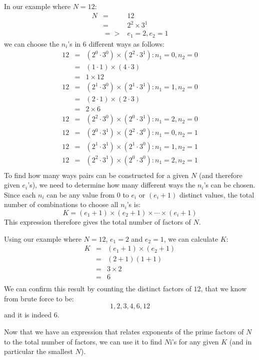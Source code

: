 \documentclass{article}
\begin{document}
In our example where $N =12$:
\begin{eqnarray*}
N & = & 12\\
& = & 2 ^ 2 \times 3 ^ 1 \\
& => & e_1 = 2, e_2 = 1
\end{eqnarray*}
we can choose the $n_i$'s in 6 different ways as follows:
\begin{eqnarray*}
12 &=& (2^0 \cdot 3^0) \times (2^2 \cdot 3^1) : n_1 = 0, n_2 = 0 \\
   &=& (1 \cdot 1) \times (4 \cdot 3) \\
   &=& 1 \times 12 \\
12 &=& (2^1 \cdot 3^0) \times (2^1 \cdot 3^1) : n_1 = 1, n_2 = 0\\
   &=& (2 \cdot 1) \times (2 \cdot 3) \\
   &=& 2 \times 6 \\
12 &=& (2^2 \cdot 3^0) \times (2^0 \cdot 3^1) : n_1 = 2, n_2 = 0\\
12 &=& (2^0 \cdot 3^1) \times (2^2 \cdot 3^0) : n_1 = 0, n_2 = 1\\
12 &=& (2^1 \cdot 3^1) \times (2^1 \cdot 3^0) : n_1 = 1, n_2 = 1\\
12 &=& (2^2 \cdot 3^1) \times (2^0 \cdot 3^0) : n_1 = 2, n_2 = 1\\
\end{eqnarray*}
To find how many ways pairs can be constructed for a given $N$ (and therefore given $e_i$'s), we need to determine how many different ways the $n_i$'s can be chosen. 
Since each $n_i$ can be any value from $0$ to $e_i$ or $(e_i + 1)$ distinct values, the total number of combinations to choose all $n_i$'s is:
$$
K = (e_1 +1) \times (e_2 + 1) \times \cdots \times (e_i + 1)
$$
This expression therefore gives the total number of factors of $N$.

Using our example where $N = 12$, $e_1 = 2$ and $e_2 = 1$, we can calculate $K$:
\begin{eqnarray*}
K & = & (e_1 +1) \times (e_2 + 1) \\
  & = & (2 + 1) ( 1 + 1) \\
  & = & 3 \times 2 \\
  & = & 6 \\
\end{eqnarray*}
We can confirm this result by counting the distinct factors of $12$, that we know from brute force to be:
$$
1, 2, 3, 4, 6, 12
$$
and it is indeed 6.

Now that we have an expression that relates exponents of the prime factors of $N$ to the total number of factors, we can use it to find $N$i's for any given $K$ (and in particular the smallest $N$).
\end{document}
